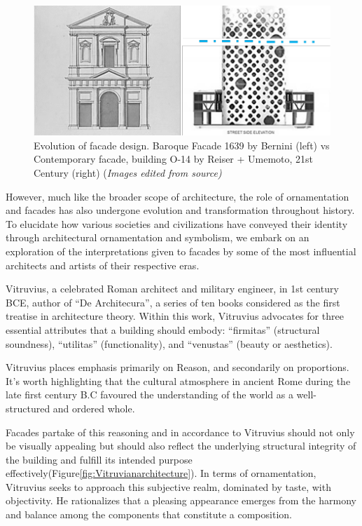      \begin{figure}[htb]
          \centering
          \includegraphics[width= \linewidth]{Images/BaroqueVsContemporaryfacade}
          \caption{Evolution of facade design.
          Baroque Facade 1639 by Bernini (left) vs Contemporary facade, building O-14 by Reiser + Umemoto, 21st Century (right) (\textit{Images edited from source)}}
          \label{fig:FacadeBaroqueVsContemporary}
        \end{figure}

However, much like the broader scope of architecture, the role of ornamentation and facades has also undergone evolution and transformation throughout history.
To elucidate how various societies and civilizations have conveyed their identity through architectural ornamentation and symbolism, we embark on an exploration of the interpretations given to facades by some of the most influential architects and artists of their respective eras.


Vitruvius, a celebrated Roman architect and military engineer, in 1st century BCE, author of ``De Architecura'', a series of ten books considered as the first treatise in architecture theory\cite{Kruft1994}.
Within this work, Vitruvius advocates for three essential attributes that a building should embody: ``firmitas'' (structural soundness), ``utilitas'' (functionality), and ``venustas'' (beauty or aesthetics)\cite{Ostwald2023}.

Vitruvius places emphasis primarily on Reason, and secondarily on proportions.
It's worth highlighting that the cultural atmosphere in ancient Rome during the late first century B.C favoured the understanding of the world as a well-structured and ordered whole\cite{Lefas2000}.

Facades partake of this reasoning and in accordance to Vitruvius should not only be visually appealing but should also reflect the underlying structural integrity of the building and fulfill its intended purpose effectively(Figure\ref{fig:Vitruvianarchitecture}).
In terms of ornamentation, Vitruvius seeks to approach this subjective realm, dominated by taste, with objectivity.
He rationalizes that a pleasing appearance emerges from the harmony and balance among the components that constitute a composition\cite{Lefas2000}.

